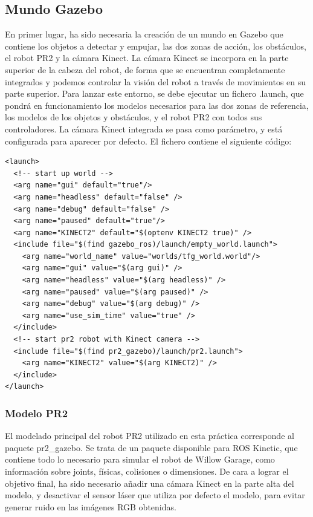 \documentclass[12pt,spanish,chapterprefix, numbers=noenddot]{book}
\numberwithin{equation}{section}
\numberwithin{figure}{section}
\begin{document}
\subsection{Mundo Gazebo}
En primer lugar, ha sido necesaria la creación de un mundo en Gazebo que contiene los objetos a detectar y empujar, las dos zonas de acción, los obstáculos, el robot PR2 y la cámara Kinect.
La cámara Kinect se incorpora en la parte superior de la cabeza del robot, de forma que se encuentran completamente integrados y podemos controlar la visión del robot a través de movimientos en su parte superior.
Para lanzar este entorno, se debe ejecutar un fichero .launch, que pondrá en funcionamiento los modelos necesarios para las dos zonas de referencia, los modelos de los objetos y obstáculos, y el robot PR2 con todos sus controladores. La cámara Kinect integrada se pasa como parámetro, y está configurada para aparecer por defecto. El fichero contiene el siguiente código:
\vspace{20pt}
	\begin{lstlisting}[frame=single]
<launch>
  <!-- start up world -->
  <arg name="gui" default="true"/>
  <arg name="headless" default="false" />
  <arg name="debug" default="false" />
  <arg name="paused" default="true"/>
  <arg name="KINECT2" default="$(optenv KINECT2 true)" />
  <include file="$(find gazebo_ros)/launch/empty_world.launch">
    <arg name="world_name" value="worlds/tfg_world.world"/> 
    <arg name="gui" value="$(arg gui)" />
    <arg name="headless" value="$(arg headless)" />
    <arg name="paused" value="$(arg paused)" />
    <arg name="debug" value="$(arg debug)" />
    <arg name="use_sim_time" value="true" />
  </include>
  <!-- start pr2 robot with Kinect camera -->
  <include file="$(find pr2_gazebo)/launch/pr2.launch">
    <arg name="KINECT2" value="$(arg KINECT2)" />
  </include>
</launch>
	\end{lstlisting}

\subsubsection{Modelo PR2}
El modelado principal del robot PR2 utilizado en esta práctica corresponde al paquete pr2\_gazebo. Se trata de un paquete disponible para ROS Kinetic, que contiene todo lo necesario para simular el robot de Willow Garage, como  información sobre joints, físicas, colisiones o dimensiones.
De cara a lograr el objetivo final, ha sido necesario añadir una cámara Kinect en la parte alta del modelo, y desactivar el sensor láser que utiliza por defecto el modelo, para evitar generar ruido en las imágenes RGB obtenidas. 
\end{document}
